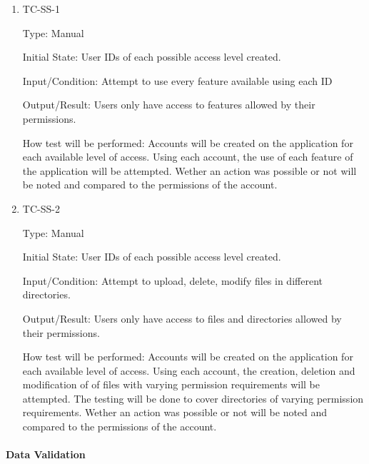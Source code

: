 \documentclass[12pt, titlepage]{article}
\begin{document}
\begin{enumerate}

  \item{TC-SS-1\\}

    Type: Manual

    Initial State: User IDs of each possible access level created.

    Input/Condition: Attempt to use every feature available using each ID

    Output/Result: Users only have access to features allowed by
    their permissions.

    How test will be performed: Accounts will be created on the
    application for each available level of access. Using each
    account, the use of each feature of the application will be
    attempted. Wether an action was possible or not will be noted and
    compared to the permissions of the account.

  \item{TC-SS-2\\}

    Type: Manual

    Initial State: User IDs of each possible access level created.

    Input/Condition: Attempt to upload, delete, modify files in
    different directories.

    Output/Result: Users only have access to files and directories
    allowed by their permissions.

    How test will be performed: Accounts will be created on the
    application for each available level of access. Using each
    account, the creation, deletion and modification of of files with
    varying permission requirements will be attempted. The testing
    will be done to cover directories of varying permission
    requirements. Wether an action was possible or not will be noted
    and compared to the permissions of the account.

\end{enumerate}

\paragraph{Data Validation}
\end{document}
